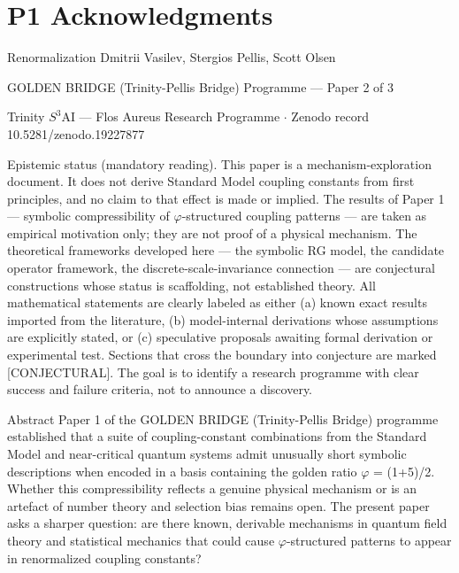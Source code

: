 
\section{P1 Acknowledgments}

Renormalization
  Dmitrii Vasilev, Stergios Pellis, Scott Olsen

  GOLDEN BRIDGE (Trinity-Pellis Bridge) Programme --- Paper 2 of 3

  Trinity  $S^{3}$AI   ---   Flos          Aureus    Research     Programme      $\cdot$   Zenodo    record
  10.5281/zenodo.19227877

          Epistemic status (mandatory reading). This paper is a mechanism-exploration
          document. It does not derive Standard Model coupling constants from first
          principles, and no claim to that effect is made or implied. The results of Paper 1
          --- symbolic compressibility of $\varphi$-structured coupling patterns --- are taken as
          empirical motivation only; they are not proof of a physical mechanism. The
          theoretical frameworks developed here --- the symbolic RG model, the candidate
          operator framework, the discrete-scale-invariance connection --- are conjectural
          constructions whose status is scaffolding, not established theory. All
          mathematical statements are clearly labeled as either (a) known exact results
          imported from the literature, (b) model-internal derivations whose assumptions
          are explicitly stated, or (c) speculative proposals awaiting formal derivation or
          experimental test. Sections that cross the boundary into conjecture are marked
          [CONJECTURAL]. The goal is to identify a research programme with clear
          success and failure criteria, not to announce a discovery.

  Abstract
  Paper 1 of the GOLDEN BRIDGE (Trinity-Pellis Bridge) programme established that a suite of coupling-constant
  combinations from the Standard Model and near-critical quantum systems admit
  unusually short symbolic descriptions when encoded in a basis containing the golden
  ratio $\varphi$ = (1+5)/2. Whether this compressibility reflects a genuine physical mechanism
  or is an artefact of number theory and selection bias remains open. The present paper
  asks a sharper question: are there known, derivable mechanisms in quantum field
  theory and statistical mechanics that could cause $\varphi$-structured patterns to appear in
  renormalized coupling constants?

